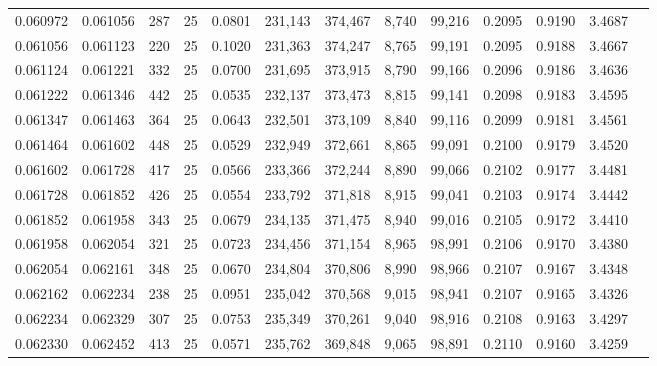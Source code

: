 \begin{tabular}{rrrrrrrrrrrrr}
0.060972 & 0.061056 &   287 &  25 &                                     0.0801 & 231,143 & 374,467 &   8,740 &  99,216 & 0.2095 & 0.9190 & 3.4687 \\
0.061056 & 0.061123 &   220 &  25 &                                     0.1020 & 231,363 & 374,247 &   8,765 &  99,191 & 0.2095 & 0.9188 & 3.4667 \\
0.061124 & 0.061221 &   332 &  25 &                                     0.0700 & 231,695 & 373,915 &   8,790 &  99,166 & 0.2096 & 0.9186 & 3.4636 \\
0.061222 & 0.061346 &   442 &  25 &                                     0.0535 & 232,137 & 373,473 &   8,815 &  99,141 & 0.2098 & 0.9183 & 3.4595 \\
0.061347 & 0.061463 &   364 &  25 &                                     0.0643 & 232,501 & 373,109 &   8,840 &  99,116 & 0.2099 & 0.9181 & 3.4561 \\
0.061464 & 0.061602 &   448 &  25 &                                     0.0529 & 232,949 & 372,661 &   8,865 &  99,091 & 0.2100 & 0.9179 & 3.4520 \\
0.061602 & 0.061728 &   417 &  25 &                                     0.0566 & 233,366 & 372,244 &   8,890 &  99,066 & 0.2102 & 0.9177 & 3.4481 \\
0.061728 & 0.061852 &   426 &  25 &                                     0.0554 & 233,792 & 371,818 &   8,915 &  99,041 & 0.2103 & 0.9174 & 3.4442 \\
0.061852 & 0.061958 &   343 &  25 &                                     0.0679 & 234,135 & 371,475 &   8,940 &  99,016 & 0.2105 & 0.9172 & 3.4410 \\
0.061958 & 0.062054 &   321 &  25 &                                     0.0723 & 234,456 & 371,154 &   8,965 &  98,991 & 0.2106 & 0.9170 & 3.4380 \\
0.062054 & 0.062161 &   348 &  25 &                                     0.0670 & 234,804 & 370,806 &   8,990 &  98,966 & 0.2107 & 0.9167 & 3.4348 \\
0.062162 & 0.062234 &   238 &  25 &                                     0.0951 & 235,042 & 370,568 &   9,015 &  98,941 & 0.2107 & 0.9165 & 3.4326 \\
0.062234 & 0.062329 &   307 &  25 &                                     0.0753 & 235,349 & 370,261 &   9,040 &  98,916 & 0.2108 & 0.9163 & 3.4297 \\
0.062330 & 0.062452 &   413 &  25 &                                     0.0571 & 235,762 & 369,848 &   9,065 &  98,891 & 0.2110 & 0.9160 & 3.4259 \\

\end{tabular}
